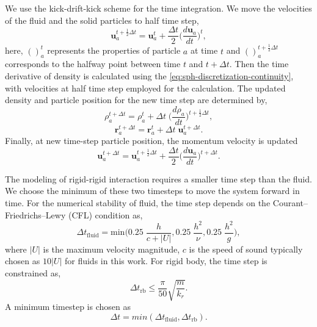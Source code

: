 \documentclass[preprint,12pt]{elsarticle}
\newcommand{\ten}[1]{\ensuremath{\mathbf{#1}}}
\begin{document}
We use the kick-drift-kick scheme \cite{monaghan-review:2005} for the time integration. We move the
velocities of the fluid and the solid particles to half time step,
\begin{equation}
  \label{eq:velocity-update-stage-1}
  \ten{u}_a^{t+\frac{1}{2} \Delta t} = \ten{u}_a^{t} + \frac{\Delta t}{2} \bigg(\frac{d\ten{u}_{a}}{dt}\bigg)^t,
\end{equation}
here, $()_a^t$ represents the properties of particle $a$ at time $t$ and
$()_a^{t+\frac{1}{2} \Delta t}$ corresponds to the halfway point between time
$t$ and $t + \Delta t$. Then the time derivative of density is calculated using the
\cref{eq:sph-discretization-continuity}, with velocities at half time step
employed for the calculation.  The updated density and particle position for
the new time step are determined by,
\begin{equation}
  \label{eq:density-update-stage-2}
  \rho_{a}^{t+\Delta t} = \rho_{a}^{t} + \Delta t \; \bigg(\frac{d\rho_{a}}{dt}\bigg)^{t+\frac{1}{2} \Delta t},
\end{equation}
\begin{equation}
  \label{eq:position-update-stage-2}
  \ten{r}_{a}^{t+\Delta t} = \ten{r}_{a}^{t} + \Delta t \; \ten{u}_{a}^{t+\Delta t}.
\end{equation}
%
Finally, at new time-step particle position, the momentum velocity is updated
\begin{equation}
  \label{eq:velocity-update-stage-3}
  \ten{u}_a^{t+\Delta t} = \ten{u}_a^{t+\frac{1}{2}\Delta t} + \frac{\Delta t}{2} \bigg(\frac{d\ten{u}_{a}}{dt}\bigg)^{t+\Delta t}.
\end{equation}


The modeling of rigid-rigid interaction requires a smaller time step than the
fluid. We choose the minimum of these two timesteps to move the system forward
in time. For the numerical stability of fluid, the time step depends on the
Courant–Friedrichs–Lewy (CFL) condition \cite{monaghan-review:2005} as,
\begin{equation}
  \label{eq:rfc:time-step-cfl}
  \Delta t_{\text{fluid}} = \mathrm{min} \bigg( 0.25 \; \frac{h}{c + |U|} ,  0.25 \; \frac{h^2}{\nu},  0.25 \; \frac{h^2}{g} \bigg),
\end{equation}
where $|U|$ is the maximum velocity magnitude, $c$ is the speed of sound
typically chosen as $10 |U|$ for fluids in this work. For rigid body, the time
step is constrained \cite{cundall_discrete_1979} as,
\begin{equation}
  \label{eq:rfc:time-step-body-force}
  \Delta t_{\text{rb}} \leq \frac{\pi}{50} \sqrt{\frac{m}{k_r}}.
\end{equation}
A minimum timestep is chosen as
\begin{equation}
  \label{eq:rfc:time-step-body-force}
  \Delta t = min(\Delta t_{\text{fluid}}, \Delta t_{\text{rb}}).
\end{equation}
\end{document}
